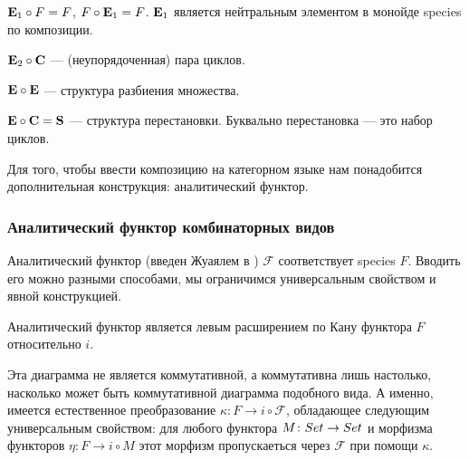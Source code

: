 \begin{example}
$\mathbf E_1 \circ F = F$, $F \circ \mathbf E_1 = F$. $\mathbf E_1$ является нейтральным элементом в
монойде species по композиции.
\end{example}
\begin{example}
$\mathbf E_2 \circ \mathbf C$ --- (неупорядоченная) пара циклов.
\end{example}
\begin{example}
$\mathbf E \circ \mathbf E$ --- структура разбиения множества.
\end{example}
\begin{example}
$\mathbf E \circ \mathbf C = \mathbf S$ --- структура перестановки.
Буквально перестановка --- это набор циклов.
\end{example}

Для того, чтобы ввести композицию на категорном языке нам
понадобится дополнительная конструкция: аналитический функтор.
\subsubsection{Аналитический функтор комбинаторных видов}
Аналитический функтор (введен Жуаялем в \cite{J2}) $\mathcal F$ соответствует
species $F$. Вводить его можно разными способами, мы ограничимся универсальным
свойством и явной конструкцией. 
\begin{definition}
Аналитический функтор является левым расширением по Кану функтора $F$
относительно $i$.

\end{definition}

Эта диаграмма не является коммутативной, а коммутативна лишь настолько, насколько может быть коммутативной диаграмма
подобного вида. А именно, имеется  естественное преобразование  $\kappa \colon
F \rightarrow i \circ \mathcal F$, обладающее следующим универсальным свойством:
для любого функтора $M \colon
Set \rightarrow Set$ и морфизма функторов $\eta \colon F \rightarrow i \circ M$
этот морфизм пропускаеться через $\mathcal F$ при помощи $\kappa$.



